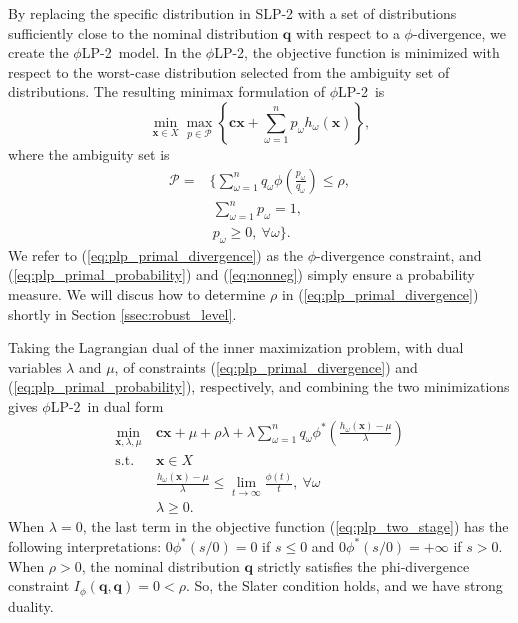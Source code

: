 \documentclass[opre,nonblindrev]{informs3} %
\newcommand{\x}{\mathbf{x}}
\renewcommand{\c}{\mathbf{c}}
\newcommand{\q}{\mathbf{q}}
\newcommand{\st}{\mbox{s.t.}}
\newcommand{\plp}{$\phi$LP-2}
\begin{document}
By replacing the specific distribution in SLP-2 with a set of distributions sufficiently close to the nominal distribution $\q$ with respect to a $\phi$-divergence, we create the \plp\ model.
In the \plp, the objective function is minimized with respect to the worst-case distribution selected from the ambiguity set of distributions.
The resulting minimax formulation of \plp\ is
\begin{equation}
	\min_{\x \in X} \max_{p \in \mathcal{P}} \left\{ \c\x + \sum_{\omega=1}^{n} p_\omega h_\omega(\x) \right\}, \label{eq:plp_primal}
\end{equation}
where the ambiguity set is
\begin{align}
	\mathcal{P} = & \Bigg\{ \sum_{\omega = 1}^{n} q_\omega \phi\left(\frac{p_\omega}{q_\omega}\right) \leq \rho, \label{eq:plp_primal_divergence} \\
	& \ \sum_{\omega=1}^{n} p_\omega = 1, \label{eq:plp_primal_probability} \\
	& \  p_\omega \geq 0,\ \forall \omega \Bigg\}. \label{eq:nonneg}
\end{align}
We refer to (\ref{eq:plp_primal_divergence}) as the $\phi$-divergence constraint, and (\ref{eq:plp_primal_probability}) and (\ref{eq:nonneg}) simply ensure a probability measure.
We will discus how to determine $\rho$ in (\ref{eq:plp_primal_divergence}) shortly in Section \ref{ssec:robust_level}.

Taking the Lagrangian dual of the inner maximization problem, with dual variables $\lambda$ and $\mu$, of constraints (\ref{eq:plp_primal_divergence}) and (\ref{eq:plp_primal_probability}), respectively, and combining the two minimizations gives \plp\ in dual form
\begin{align}
	\min_{\x,\lambda,\mu} \ & \c\x + \mu + \rho \lambda + \lambda \sum_{\omega=1}^{n} q_\omega \phi^*\left(\frac{h_\omega(\x) - \mu}{\lambda}\right) \label{eq:plp_two_stage} \\
	\st \ & \x \in X \nonumber \\
	& \frac{h_\omega(\x) - \mu}{\lambda} \leq \lim_{t \rightarrow \infty} \frac{\phi(t)}{t}, \ \forall \omega \label{eq:plp_feas_constraint}\\
	& \lambda \geq 0. \nonumber
\end{align}
When $\lambda =0$, the last term in the objective function (\ref{eq:plp_two_stage}) has the following interpretations: $0\phi^*(s/0)=0$ if $s\leq 0$ and  $0\phi^*(s/0)=+\infty$ if $s > 0$.
When $\rho>0$, the nominal distribution $\q$ strictly satisfies the phi-divergence constraint $I_{\phi}(\q,\q)=0<\rho$. 
So, the Slater condition holds, and we have strong duality.
\end{document}

